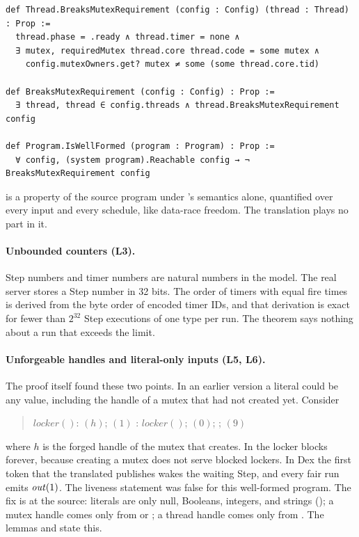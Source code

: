 \begin{Verbatim}
def Thread.BreaksMutexRequirement (config : Config) (thread : Thread) : Prop :=
  thread.phase = .ready ∧ thread.timer = none ∧
  ∃ mutex, requiredMutex thread.core thread.code = some mutex ∧
    config.mutexOwners.get? mutex ≠ some (some thread.core.tid)

def BreaksMutexRequirement (config : Config) : Prop :=
  ∃ thread, thread ∈ config.threads ∧ thread.BreaksMutexRequirement config

def Program.IsWellFormed (program : Program) : Prop :=
  ∀ config, (system program).Reachable config → ¬ BreaksMutexRequirement config
\end{Verbatim}

 is a property of the source program under
\Lang{}'s semantics alone, quantified over every input and every schedule,
like data-race freedom. The translation plays no part in it.

\paragraph{Unbounded counters (L3).}
Step numbers and timer numbers are natural numbers in the model. The real
server stores a Step number in 32 bits. The order of timers with equal fire
times is derived from the byte order of encoded timer IDs, and that
derivation is exact for fewer than $2^{32}$ Step executions of one type per
run. The theorem says nothing about a run that exceeds the limit.

\paragraph{Unforgeable handles and literal-only inputs (L5, L6).}
The proof itself found these two points. In an earlier version a literal
could be any value, including the handle of a mutex that  had
not created yet. Consider
\begin{quote}\small
$\mathit{locker}()$: $(h)$; $(1)$ \qquad
{}:  $\mathit{locker}()$; $(0)$;
; $(9)$
\end{quote}
where $h$ is the forged handle of the mutex that  creates. In
\Lang{} the locker blocks forever, because creating a mutex does not serve
blocked lockers. In Dex the first token that the translated 
publishes wakes the waiting Step, and every fair run emits $\mathit{out}(1)$.
The liveness statement was false for this well-formed program. The fix is
at the source: literals are only null, Booleans, integers, and strings
(); a mutex handle comes only from  or
; a thread handle comes only from . The lemmas
 and  state this.

